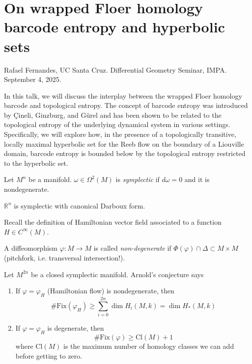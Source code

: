\section{On wrapped Floer homology barcode entropy and hyperbolic sets}
\label{section-wrapped-Floer-homology-barcode-entropy-and-hyperbolic-sets}

\noindent
Rafael Fernandes, UC Santa Cruz.
Differential Geometry Seminar, IMPA. 
September 4, 2025.

 In this talk, we will discuss the interplay between the
wrapped Floer homology barcode and topological entropy. The concept of barcode
entropy was introduced by Çineli, Ginzburg, and Gürel and has been shown to be
related to the topological entropy of the underlying dynamical system in various
settings. Specifically, we will explore how, in the presence of a topologically
transitive, locally maximal hyperbolic set for the Reeb flow on the boundary of
a Liouville domain, barcode entropy is bounded below by the topological entropy
restricted to the hyperbolic set.

\medskip\noindent

Let $M^n$ be a manifold.
$\omega \in \Omega^2(M)$ is {\it symplectic} if $d \omega=0$ and it is
nondegenerate.

\begin{example}
\label{example-Rn-is-symplectic}
$\mathbb{R}^n$ is symplectic with canonical Darboux form.
\end{example}

Recall the definition of Hamiltonian vector field
associated to a function $H \in C^\infty(M)$.

\begin{definition}
\label{definition-nondegenerate-diffeomorphism}
A diffeomorphism $\varphi:M \to M$ is called
{\it non-degenerate} if $\Phi(\varphi)\cap\Delta \subset M\times M$
(pitchfork, i.e. transversal intersection!).
\end{definition}

Let $M^{2n}$ be a closed symplectic manifold. Arnold's conjecture says
\begin{enumerate}
\item If $\varphi=\varphi_H$ (Hamiltonian flow) is nondegenerate, then
$$
\# \text{Fix}(\varphi_H) \geq \sum_{i=0}^{2n}\dim H_i(M,k)=\dim H_*(M,k)
$$
\item If $\varphi=\varphi_H$ is degenerate, then
$$
\# \text{Fix}(\varphi)\geq \text{Cl}(M)+1
$$
where $\text{Cl}(M)$ is the maximum number of homology classes
we can add before getting to zero.
\end{enumerate}

